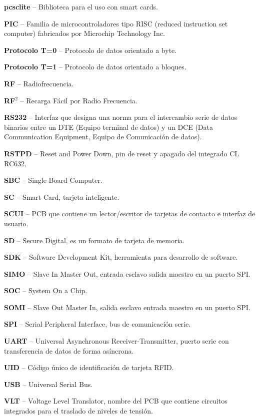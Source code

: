 \begin{glosario}
{\bf{pcsclite}} – Biblioteca para el uso con smart cards.

{\bf{PIC}} – Familia de microcontroladores tipo RISC (reduced instruction set computer) fabricados por Microchip Technology Inc.

{\bf{Protocolo T=0}} – Protocolo de datos orientado a byte.

{\bf{Protocolo T=1}} – Protocolo de datos orientado a bloques.

{\bf{RF}} – Radiofrecuencia.

{\bf{RF$^{2}$}} – Recarga Fácil por Radio Frecuencia.

{\bf{RS232}} – Interfaz que designa una norma para el intercambio serie de datos binarios entre un DTE (Equipo terminal de datos) y un DCE (Data Communication Equipment, Equipo de Comunicación de datos).

{\bf{RSTPD}} – Reset and Power Down, pin de reset y apagado del integrado CL RC632.

{\bf{SBC}} – Single Board Computer.

{\bf{SC}} – Smart Card, tarjeta inteligente.

{\bf{SCUI}} – PCB que contiene un lector/escritor de tarjetas de contacto e interfaz de usuario.

{\bf{SD}} – Secure Digital, es un formato de tarjeta de memoria.

{\bf{SDK}} – Software Development Kit, herramienta para desarrollo de software.

{\bf{SIMO}} – Slave In Master Out, entrada esclavo salida maestro en un puerto SPI.

{\bf{SOC}} – System On a Chip.

{\bf{SOMI}} – Slave Out Master In, salida esclavo entrada maestro en un puerto SPI.

{\bf{SPI}} – Serial Peripheral Interface, bus de comunicación serie.

{\bf{UART}} – Universal Asynchronous Receiver-Transmitter, puerto serie con transferencia de datos de forma asíncrona.

{\bf{UID}} – Código único de identificación de tarjeta RFID.

{\bf{USB}} – Universal Serial Bus.

{\bf{VLT}} – Voltage Level Translator, nombre del PCB que contiene circuitos integrados para el traslado de niveles de tensión.

\end{glosario}